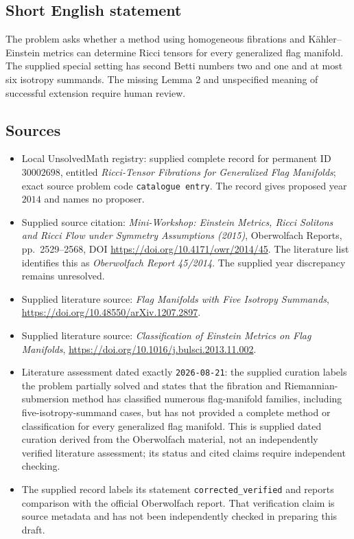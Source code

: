 \documentclass[11pt]{article}
\begin{document}
\subsection{Short English statement}
The problem asks whether a method using homogeneous fibrations and Kähler--Einstein metrics can determine Ricci tensors for every generalized flag manifold. The supplied special setting has second Betti numbers two and one and at most six isotropy summands. The missing Lemma 2 and unspecified meaning of successful extension require human review.
\subsection{Sources}
\begin{itemize}
\item Local UnsolvedMath registry: supplied complete record for permanent ID \(30002698\), entitled \emph{Ricci-Tensor Fibrations for Generalized Flag Manifolds}; exact source problem code \texttt{catalogue entry}. The record gives proposed year \(2014\) and names no proposer.
\item Supplied source citation: \emph{Mini-Workshop: Einstein Metrics, Ricci Solitons and Ricci Flow under Symmetry Assumptions (2015)}, Oberwolfach Reports, pp.~2529--2568, DOI \url{https://doi.org/10.4171/owr/2014/45}. The literature list identifies this as \emph{Oberwolfach Report 45/2014}. The supplied year discrepancy remains unresolved.
\item Supplied literature source: \emph{Flag Manifolds with Five Isotropy Summands}, \url{https://doi.org/10.48550/arXiv.1207.2897}.
\item Supplied literature source: \emph{Classification of Einstein Metrics on Flag Manifolds}, \url{https://doi.org/10.1016/j.bulsci.2013.11.002}.
\item Literature assessment dated exactly \texttt{2026-08-21}: the supplied curation labels the problem partially solved and states that the fibration and Riemannian-submersion method has classified numerous flag-manifold families, including five-isotropy-summand cases, but has not provided a complete method or classification for every generalized flag manifold. This is supplied dated curation derived from the Oberwolfach material, not an independently verified literature assessment; its status and cited claims require independent checking.
\item The supplied record labels its statement \texttt{corrected\_verified} and reports comparison with the official Oberwolfach report. That verification claim is source metadata and has not been independently checked in preparing this draft.
\end{itemize}
\end{document}
